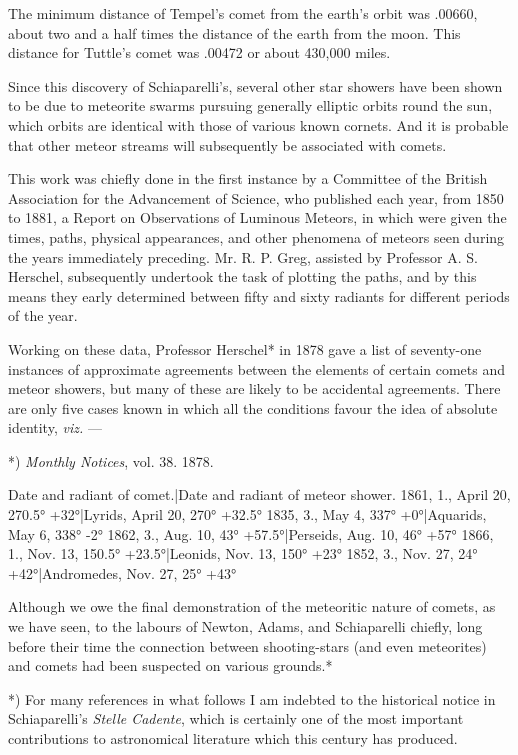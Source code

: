 \documentclass[a4paper, 12pt, oneside, polutonikogreek, english]{article}
\begin{document}
The minimum distance of Tempel's comet from the earth's orbit was .00660, about two and a half times the distance of the earth from the moon. This distance for Tuttle's comet was .00472 or about 430,000 miles.

Since this discovery of Schiaparelli's, several other star showers have been shown to be due to meteorite swarms pursuing generally elliptic orbits round the sun, which orbits are identical with those of various known cornets. And it is probable that other meteor streams will subsequently be associated with comets.

This work was chiefly done in the first instance by a Committee of the British Association for the Advancement of Science, who published each year, from 1850 to 1881, a Report on Observations of Luminous Meteors, in which were given the times, paths, physical appearances, and other phenomena of meteors seen during the years immediately preceding. Mr. R. P. Greg, assisted by Professor A. S. Herschel, subsequently undertook the task of plotting the paths, and by this means they early determined between fifty and sixty radiants for different periods of the year.

Working on these data, Professor Herschel* in 1878 gave a list of seventy-one instances of approximate agreements between the elements of certain comets and meteor showers, but many of these are likely to be accidental agreements. There are only five cases known in which all the conditions favour the idea of absolute identity, \emph{viz.} ---

*) \emph{Monthly Notices}, vol. 38. 1878.

Date and radiant of comet.|Date and radiant of meteor shower. 
1861, 1., April 20, 270.5° +32°|Lyrids, April 20, 270° +32.5° 
1835, 3., May 4, 337° +0°|Aquarids, May 6, 338° -2° 
1862, 3., Aug. 10, 43° +57.5°|Perseids, Aug. 10, 46° +57° 
1866, 1., Nov. 13, 150.5° +23.5°|Leonids, Nov. 13, 150° +23° 
1852, 3., Nov. 27, 24° +42°|Andromedes, Nov. 27, 25° +43°

Although we owe the final demonstration of the meteoritic nature of comets, as we have seen, to the labours of Newton, Adams, and Schiaparelli chiefly, long before their time the connection between shooting-stars (and even meteorites) and comets had been suspected on various grounds.*

*) For many references in what follows I am indebted to the historical notice in Schiaparelli's \emph{Stelle Cadente}, which is certainly one of the most important contributions to astronomical literature which this century has produced.
\end{document}
